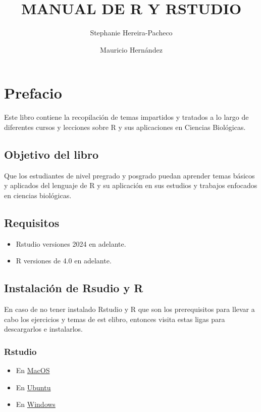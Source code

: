 \documentclass[
]{book}
\title{MANUAL DE R Y RSTUDIO}
\author{Stephanie Hereira-Pacheco \and Mauricio Hernández}
\date{}
\providecommand{\tightlist}{%
  \setlength{\itemsep}{0pt}\setlength{\parskip}{0pt}}
\begin{document}
\maketitle

{
\setcounter{tocdepth}{1}
\tableofcontents
}
\chapter*{Prefacio}\label{prefacio}

Este libro contiene la recopilación de temas impartidos y tratados a lo largo de diferentes cursos y lecciones sobre R y sus aplicaciones en Ciencias Biológicas.

\section{Objetivo del libro}\label{objetivo-del-libro}

Que los estudiantes de nivel pregrado y posgrado puedan aprender temas básicos y aplicados del lenguaje de R y su aplicación en sus estudios y trabajos enfocados en ciencias biológicas.

\section{\texorpdfstring{\textbf{Requisitos}}{Requisitos}}\label{requisitos}

\begin{itemize}
\tightlist
\item
  Rstudio versiones 2024 en adelante.
\item
  R versiones de 4.0 en adelante.
\end{itemize}

\section{Instalación de Rsudio y R}\label{instalaciuxf3n-de-rsudio-y-r}

En caso de no tener instalado Rstudio y R que son los prerequisitos para llevar a cabo los ejercicios y temas de est elibro, entonces visita estas ligas para descargarlos e instalarlos.

\subsection{Rstudio}\label{rstudio}

\begin{itemize}
\tightlist
\item
  En \href{https://download1.rstudio.org/electron/macos/RStudio-2024.12.1-563.dmg}{MacOS}
\item
  En \href{https://download1.rstudio.org/electron/jammy/amd64/rstudio-2024.12.1-563-amd64.deb}{Ubuntu}
\item
  En \href{https://download1.rstudio.org/electron/windows/RStudio-2024.12.1-563.exe}{Windows}
\end{itemize}
\end{document}
